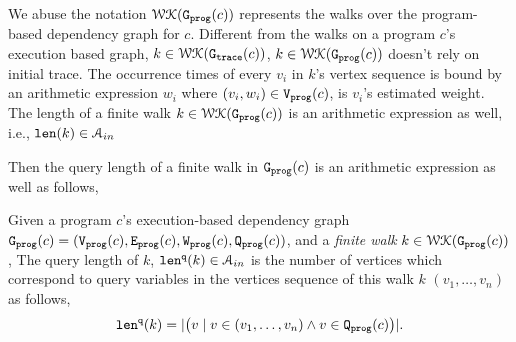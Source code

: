   We abuse the notation $\mathcal{WK}(\mathtt{{G_{prog}}}(c))$ represents the walks over the program-based dependency graph for $c$.
Different from the walks on a program $c$'s execution based graph,
 $k \in \mathcal{WK}(\mathtt{{G_{trace}}}(c))$, 
$k \in \mathcal{WK}(\mathtt{{G_{prog}}}(c))$ doesn't rely on initial trace.
The occurrence times of every $v_i $ in $k$'s vertex sequence is bound by 
an arithmetic expression $w_i$ where $(v_i, w_i) \in \mathtt{{V_{prog}}}(c)$, is $v_i$'s estimated weight. 
 The length of a finite walk $k \in \mathcal{WK}(\mathtt{{G_{prog}}}(c))$ is an arithmetic expression
 as well, i.e., $\mathtt{len}(k) \in \mathcal{A}_{in}$

 Then the query length of a finite walk in  $\mathtt{{G_{prog}}}(c)$ is an arithmetic expression as well as follows,
\begin{defn}
  \label{def:qlen}
  Given 
  a program $c$'s execution-based dependency graph 
  $\mathtt{{G_{prog}}}({c}) = (\mathtt{{V_{prog}}}(c), \mathtt{{E_{prog}}}(c), \mathtt{{W_{prog}}}(c), \mathtt{{Q_{prog}}}(c))$, 
   and a \emph{finite walk} $k \in \mathcal{WK}(\mathtt{{G_{prog}}}(c))$,
  The query length of $k$, $\mathtt{len}^{\tt q}(k) \in \mathcal{A}_{in}$ 
  is the number of vertices which correspond to query variables in the vertices sequence of this walk $k$
  $(v_1, \ldots, v_{n})$ as follows, 
  \[
    \mathtt{len}^{\tt q}(k) = |\big( v \mid v \in (v_1, \ldots, v_{n}) \land v \in \mathtt{{Q_{prog}}}(c) \big)|.
  \]
  \end{defn}
